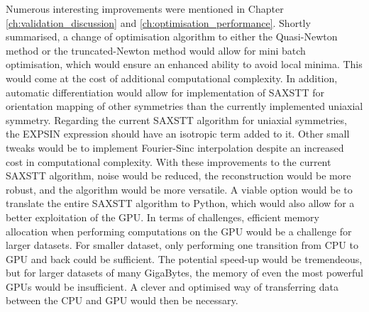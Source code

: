 Numerous interesting improvements were mentioned in Chapter \ref{ch:validation_discussion} and \ref{ch:optimisation_performance}.
Shortly summarised, a change of optimisation algorithm to either the Quasi-Newton method or the truncated-Newton method would allow for mini batch optimisation,
which would ensure an enhanced ability to avoid local minima. This would come at the cost of additional computational complexity.
In addition, automatic differentiation would allow for implementation of SAXSTT for orientation mapping of other symmetries than the currently implemented uniaxial symmetry.
Regarding the current SAXSTT algorithm for uniaxial symmetries, the EXPSIN expression should have an isotropic term added to it.
Other small tweaks would be to implement Fourier-Sinc interpolation despite an increased cost in computational complexity.
With these improvements to the current SAXSTT algorithm, noise would be reduced, the reconstruction would be more robust, and the algorithm would be more versatile.
A viable option would be to translate the entire SAXSTT algorithm to Python, which would also allow for a better exploitation of the GPU.
In terms of challenges, efficient memory allocation when performing computations on the GPU would be a challenge for larger datasets.
For smaller dataset, only performing one transition from CPU to GPU and back could be sufficient. The potential speed-up would be tremendeous, but for larger datasets of many GigaBytes,
the memory of even the most powerful GPUs would be insufficient. A clever and optimised way of transferring data between the CPU and GPU would then be necessary.

